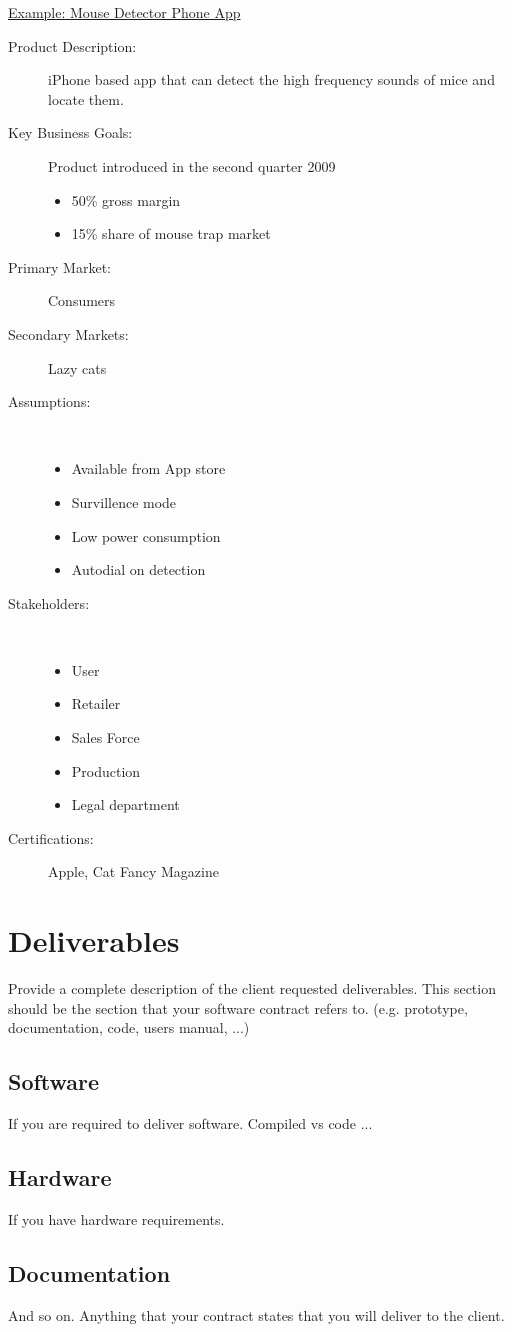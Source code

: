 \noindent
\underline{Example:  Mouse Detector Phone App}

\begin{description}
\item [Product Description:] iPhone based app that can detect the high frequency sounds of mice and locate them.

\item [Key Business Goals:] Product introduced in the second quarter 2009
\begin{itemize}
\item 50\% gross margin
\item 15\% share of mouse trap market
\end{itemize}

\item [Primary Market:] Consumers
\item [Secondary Markets:] Lazy cats

\item [Assumptions:]  ~~ \\
\begin{itemize}
\item Available from App store
\item Survillence mode
\item Low power consumption
\item Autodial on detection
\end{itemize}

\item [Stakeholders:]  ~~ \\
\begin{itemize}
\item User
\item Retailer
\item Sales Force
\item Production
\item Legal department
\end{itemize}

\item [Certifications:] Apple, Cat Fancy Magazine
\end{description}

\section{Deliverables}

Provide a complete description of the client requested deliverables.   This section should be the section that your software contract refers to.
(e.g. prototype, documentation, code, users manual, ...)


\subsection{Software}
If you are required to deliver software.  Compiled vs code ...

\subsection{Hardware}
If you have hardware requirements.

\subsection{Documentation}
And so on.  Anything that your contract states that you will deliver to the client.


